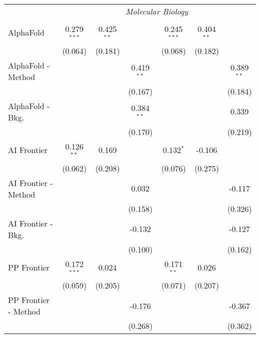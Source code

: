 \begin{tabular}{lcccccc}
 & \multicolumn{6}{c}{\textit{Molecular Biology}} \\ \\
   AlphaFold            & 0.279$^{***}$ & 0.425$^{**}$ &              & 0.245$^{***}$ & 0.404$^{**}$ &   \\   
                        & (0.064)       & (0.181)      &              & (0.068)       & (0.182)      &   \\   
   AlphaFold - Method   &               &              & 0.419$^{**}$ &               &              & 0.389$^{**}$\\   
                        &               &              & (0.167)      &               &              & (0.184)\\   
   AlphaFold - Bkg.     &               &              & 0.384$^{**}$ &               &              & 0.339\\   
                        &               &              & (0.170)      &               &              & (0.219)\\   
   AI Frontier          & 0.126$^{**}$  & 0.169        &              & 0.132$^{*}$   & -0.106       &   \\   
                        & (0.062)       & (0.208)      &              & (0.076)       & (0.275)      &   \\   
   AI Frontier - Method &               &              & 0.032        &               &              & -0.117\\   
                        &               &              & (0.158)      &               &              & (0.326)\\   
   AI Frontier - Bkg.   &               &              & -0.132       &               &              & -0.127\\   
                        &               &              & (0.100)      &               &              & (0.162)\\   
   PP Frontier          & 0.172$^{***}$ & 0.024        &              & 0.171$^{**}$  & 0.026        &   \\   
                        & (0.059)       & (0.205)      &              & (0.071)       & (0.207)      &   \\   
   PP Frontier - Method &               &              & -0.176       &               &              & -0.367\\   
                        &               &              & (0.268)      &               &              & (0.362)\\   

\end{tabular}
